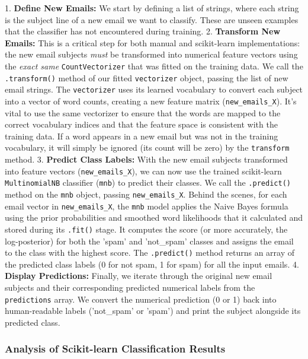 \documentclass[12pt,a4paper]{article}
\begin{document}
1.  \textbf{Define New Emails:} We start by defining a list of strings, where each string is the subject line of a new email we want to classify. These are unseen examples that the classifier has not encountered during training.
2.  \textbf{Transform New Emails:} This is a critical step for both manual and scikit-learn implementations: the new email subjects \textit{must} be transformed into numerical feature vectors using the \textit{exact same} \texttt{CountVectorizer} that was fitted on the training data. We call the \texttt{.transform()} method of our fitted \texttt{vectorizer} object, passing the list of new email strings. The \texttt{vectorizer} uses its learned vocabulary to convert each subject into a vector of word counts, creating a new feature matrix (\texttt{new\_emails\_X}). It's vital to use the same vectorizer to ensure that the words are mapped to the correct vocabulary indices and that the feature space is consistent with the training data. If a word appears in a new email but was not in the training vocabulary, it will simply be ignored (its count will be zero) by the \texttt{transform} method.
3.  \textbf{Predict Class Labels:} With the new email subjects transformed into feature vectors (\texttt{new\_emails\_X}), we can now use the trained scikit-learn \texttt{MultinomialNB} classifier (\texttt{mnb}) to predict their classes. We call the \texttt{.predict()} method on the \texttt{mnb} object, passing \texttt{new\_emails\_X}. Behind the scenes, for each email vector in \texttt{new\_emails\_X}, the \texttt{mnb} model applies the Naive Bayes formula using the prior probabilities and smoothed word likelihoods that it calculated and stored during its \texttt{.fit()} stage. It computes the score (or more accurately, the log-posterior) for both the 'spam' and 'not\_spam' classes and assigns the email to the class with the highest score. The \texttt{.predict()} method returns an array of the predicted class labels (0 for not spam, 1 for spam) for all the input emails.
4.  \textbf{Display Predictions:} Finally, we iterate through the original new email subjects and their corresponding predicted numerical labels from the \texttt{predictions} array. We convert the numerical prediction (0 or 1) back into human-readable labels ('not\_spam' or 'spam') and print the subject alongside its predicted class.

\subsubsection{Analysis of Scikit-learn Classification Results}
\end{document}
